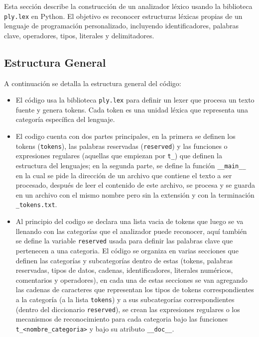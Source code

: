 \documentclass{article}
\begin{document}
Esta sección describe la construcción de un analizador léxico usando la biblioteca \texttt{ply.lex} en Python. El objetivo es reconocer estructuras léxicas propias de un lenguaje de programación personalizado, incluyendo identificadores, palabras clave, operadores, tipos, literales y delimitadores.

\subsection{Estructura General}

A continuación se detalla la estructura general del código:

\begin{itemize}
  \item El código usa la biblioteca \texttt{ply.lex} para definir un lexer que procesa un texto fuente y genera tokens. Cada token es una unidad léxica que representa una categoría específica del lenguaje.
  \item El codigo cuenta con dos partes principales, en la primera se definen los tokens (\texttt{tokens}), las palabras reservadas (\texttt{reserved}) y las funciones o expresiones regulares (aquellas que empiezan por \texttt{t\_}) que definen la estructura del lenguajes; en la segunda parte, se define la función \texttt{\_\_main\_\_} en la cual se pide la dirección de un archivo que contiene el texto a ser procesado, después de leer el contenido de este archivo, se procesa y se guarda en un archivo con el mismo nombre pero sin la extensión y con la terminación \texttt{\_tokens.txt}.
  \item Al principio del codigo se declara una lista vacia de tokens que luego se va llenando con las categorías que el analizador puede reconocer, aquí también se define la variable \texttt{reserved} usada para definir las palabras clave que pertenecen a una categoria. El código se organiza en varias secciones que definen las categorías y subcategorías dentro de estas (tokens, palabras reservadas, tipos de datos, cadenas, identificadores, literales numéricos, comentarios y operadores), en cada una de estas secciones se van agregando las cadenas de caracteres que representan los tipos de tokens correspondientes a la categoría (a la lista \texttt{tokens}) y a sus subcategorías correspondientes (dentro del diccionario \texttt{reserved}), se crean las expresiones regulares o los mecanismos de reconocimiento para cada categoria bajo las funciones \texttt{t\_<nombre\_categoria>} y bajo su atributo \texttt{\_\_doc\_\_}.
\end{itemize}
\end{document}
